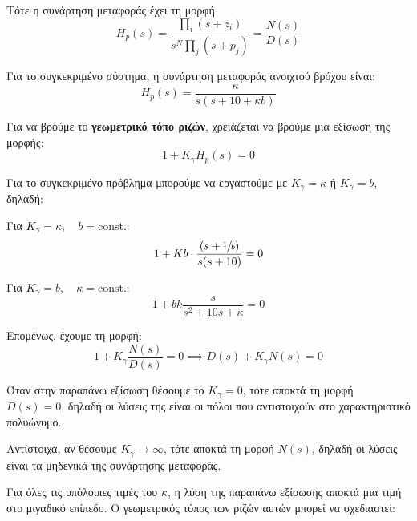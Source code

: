 \documentclass[11pt,a4paper,notitlepage,fleqn,final]{article}
\begin{document}

Τότε η συνάρτηση μεταφοράς έχει τη μορφή
\[
H_p(s) = \frac{\prod_{i}(s+z_i)}{s^N \prod_j (s+p_j)}
= \frac{N(s)}{D(s)}
\]

Για το συγκεκριμένο σύστημα, η συνάρτηση μεταφοράς ανοιχτού βρόχου
είναι:
\[
H_p(s) = \frac{κ}{s(s+10+κb)}
\]

Για να βρούμε το \textbf{γεωμετρικό τόπο ριζών}, χρειάζεται να
βρούμε μια εξίσωση της μορφής:
\[
\boxed{1+ K_\gamma H_p(s) = 0}
\]

Για το συγκεκριμένο πρόβλημα μπορούμε να εργαστούμε με \( K_γ = κ \)
ή \( Κ_\gamma = b \), δηλαδή:
\begin{enumgreekparen}
	\item Για \( K_γ = κ,\quad b=\mathrm{const.} \):
	\[
	1 + Kb \cdot \frac{(s+\sfrac{1}{b} )}{s(s+10)} = 0
	\]
	\item Για \( K_γ = b,\quad κ=\mathrm{const.}\):
	\[
	1 + bk \frac{s}{s^2+10s+κ} = 0
	\]
\end{enumgreekparen}


Επομένως, έχουμε τη μορφή:
\[
1+K_γ\frac{N(s)}{D(s)} = 0
\implies
D(s) + K_γN(s) = 0
\]

Όταν στην παραπάνω εξίσωση θέσουμε το \( K_γ = 0 \), τότε αποκτά
τη μορφή \( D(s) = 0\), δηλαδή οι λύσεις της είναι οι πόλοι που αντιστοιχούν
στο χαρακτηριστικό πολυώνυμο.

Αντίστοιχα, αν θέσουμε \( Κ_γ \to \infty \), τότε αποκτά τη μορφή
\( N(s) \), δηλαδή οι λύσεις είναι τα μηδενικά της συνάρτησης μεταφοράς.

Για όλες τις υπόλοιπες τιμές του \( κ \), η λύση της παραπάνω
εξίσωσης αποκτά μια τιμή στο μιγαδικό επίπεδο. Ο γεωμετρικός τόπος
των ριζών αυτών μπορεί να σχεδιαστεί:
\end{document}
